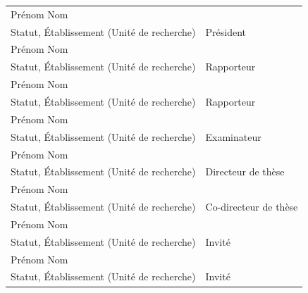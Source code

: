 \documentclass[a4paper]{article}
\newcommand{\jurynameA}{Prénom Nom}
\newcommand{\juryadressA}{Statut, Établissement (Unité de recherche)}
\newcommand{\juryroleA}{Président}
\newcommand{\jurynameB}{Prénom Nom}
\newcommand{\juryadressB}{Statut, Établissement (Unité de recherche)}
\newcommand{\juryroleB}{Rapporteur}
\newcommand{\jurynameC}{Prénom Nom}
\newcommand{\juryadressC}{Statut, Établissement (Unité de recherche)}
\newcommand{\juryroleC}{Rapporteur}
\newcommand{\jurynameD}{Prénom Nom}
\newcommand{\juryadressD}{Statut, Établissement (Unité de recherche)}
\newcommand{\juryroleD}{Examinateur}
\newcommand{\jurynameE}{Prénom Nom}
\newcommand{\juryadressE}{Statut, Établissement (Unité de recherche)}
\newcommand{\juryroleE}{Directeur de thèse}
\newcommand{\jurynameF}{Prénom Nom}
\newcommand{\juryadressF}{Statut, Établissement (Unité de recherche)}
\newcommand{\juryroleF}{Co-directeur de thèse}
\newcommand{\jurynameG}{Prénom Nom}
\newcommand{\juryadressG}{Statut, Établissement (Unité de recherche)}
\newcommand{\juryroleG}{Invité}
\newcommand{\jurynameH}{Prénom Nom}
\newcommand{\juryadressH}{Statut, Établissement (Unité de recherche)}
\newcommand{\juryroleH}{Invité}
\begin{document}
\begin{textblock}{10.3}
	\label{jury} 																				%
	\begin{flushleft}
	\begin{tabular}{@{} L{10cm} R{4cm}}
		\jurynameA  \\ \juryadressA & \juryroleA \\
		\jurynameB  \\ \juryadressB & \juryroleB \\
		\jurynameC  \\ \juryadressC & \juryroleC \\
		\jurynameD  \\ \juryadressD & \juryroleD \\
		\jurynameE  \\ \juryadressE & \juryroleE \\
		\jurynameF  \\ \juryadressF & \juryroleF \\
		\jurynameG  \\ \juryadressG & \juryroleG \\
		\jurynameH  \\ \juryadressH & \juryroleH \\
	\end{tabular} 
	\end{flushleft}   
\end{textblock}
\end{document}
